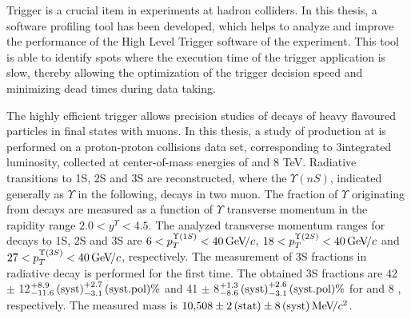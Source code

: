 Trigger is a crucial item in experiments at hadron colliders. In this thesis,  
a software profiling tool has been developed, which helps to analyze and improve the 
performance of the High Level Trigger software of the \lhcb experiment. 
This tool is able to identify spots where the execution time of the trigger application is slow, 
thereby allowing the optimization of the trigger decision speed and minimizing dead times 
during data taking. 

The highly efficient \lhcb trigger allows precision studies 
of decays of heavy flavoured particles in final states with muons.  
In this thesis, a study of \chib production at \lhcb is performed on a proton-proton collisions data set, 
corresponding to 3\invfb integrated luminosity, collected
at center-of-mass energies of  and 8 TeV. Radiative \chib transitions to
\Y1S, \Y2S and \Y3S are reconstructed, where the $\Upsilon(nS)$, indicated generally as $\Upsilon$ in the following, decays in two muon. 
The fraction of $\Upsilon$ originating from \chib decays
are measured as a function of $\Upsilon$ transverse momentum in the \lhcb rapidity range
$2.0 < y^{\Upsilon} < 4.5$. The analyzed transverse momentum ranges for decays
to \Y1S, \Y2S and \Y3S are $6<p_T^{\Y1S}<40\gevc$, $18<p_T^{\Y2S}<40\gevc$ and
$27<p_T^{\Y3S}<40\gevc$, respectively. The measurement of
\Y3S fractions in radiative \chibThreeP decay is performed for the first time.
The obtained \Y3S fractions are 42 $\pm$ 12\stat${}^{+8.9}_{-11.6}\mathrm{\,(syst)}^{+2.7}_{-3.1}\mathrm{\,(syst.pol)} \%$ and 41 $\pm$ 8\stat${}^{+1.3}_{-8.6}\mathrm{\,(syst)}^{+2.6}_{-3.1}\mathrm{\,(syst.pol)} \%$ for  and 8 \tev, respectively. The measured \chiboneThreeP mass is $10{,}508 \pm 2\mathrm{\,(stat)} \pm
8\mathrm{\,(syst)} {\mathrm{\,Me\kern -0.1em V\!/}c^2}$.


